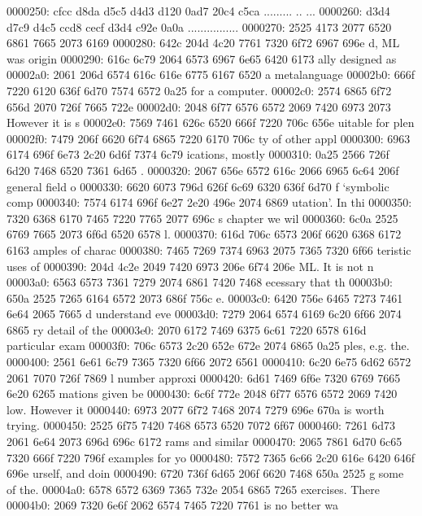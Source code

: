 0000250: cfcc d8da d5c5 d4d3 d120 0ad7 20c4 c5ca  ......... .. ...
0000260: d3d4 d7c9 d4c5 ccd8 cecf d3d4 c92e 0a0a  ................
0000270: 2525 4173 2077 6520 6861 7665 2073 6169  %
0000280: 642c 204d 4c20 7761 7320 6f72 6967 696e  d, ML was origin
0000290: 616c 6c79 2064 6573 6967 6e65 6420 6173  ally designed as
00002a0: 2061 206d 6574 616c 616e 6775 6167 6520   a metalanguage 
00002b0: 666f 7220 6120 636f 6d70 7574 6572 0a25  for a computer.%
00002c0: 2574 6865 6f72 656d 2070 726f 7665 722e  %
00002d0: 2048 6f77 6576 6572 2069 7420 6973 2073   However it is s
00002e0: 7569 7461 626c 6520 666f 7220 706c 656e  uitable for plen
00002f0: 7479 206f 6620 6f74 6865 7220 6170 706c  ty of other appl
0000300: 6963 6174 696f 6e73 2c20 6d6f 7374 6c79  ications, mostly
0000310: 0a25 2566 726f 6d20 7468 6520 7361 6d65  .%
0000320: 2067 656e 6572 616c 2066 6965 6c64 206f   general field o
0000330: 6620 6073 796d 626f 6c69 6320 636f 6d70  f `symbolic comp
0000340: 7574 6174 696f 6e27 2e20 496e 2074 6869  utation'. In thi
0000350: 7320 6368 6170 7465 7220 7765 2077 696c  s chapter we wil
0000360: 6c0a 2525 6769 7665 2073 6f6d 6520 6578  l.%
0000370: 616d 706c 6573 206f 6620 6368 6172 6163  amples of charac
0000380: 7465 7269 7374 6963 2075 7365 7320 6f66  teristic uses of
0000390: 204d 4c2e 2049 7420 6973 206e 6f74 206e   ML. It is not n
00003a0: 6563 6573 7361 7279 2074 6861 7420 7468  ecessary that th
00003b0: 650a 2525 7265 6164 6572 2073 686f 756c  e.%
00003c0: 6420 756e 6465 7273 7461 6e64 2065 7665  d understand eve
00003d0: 7279 2064 6574 6169 6c20 6f66 2074 6865  ry detail of the
00003e0: 2070 6172 7469 6375 6c61 7220 6578 616d   particular exam
00003f0: 706c 6573 2c20 652e 672e 2074 6865 0a25  ples, e.g. the.%
0000400: 2561 6e61 6c79 7365 7320 6f66 2072 6561  %
0000410: 6c20 6e75 6d62 6572 2061 7070 726f 7869  l number approxi
0000420: 6d61 7469 6f6e 7320 6769 7665 6e20 6265  mations given be
0000430: 6c6f 772e 2048 6f77 6576 6572 2069 7420  low. However it 
0000440: 6973 2077 6f72 7468 2074 7279 696e 670a  is worth trying.
0000450: 2525 6f75 7420 7468 6573 6520 7072 6f67  %
0000460: 7261 6d73 2061 6e64 2073 696d 696c 6172  rams and similar
0000470: 2065 7861 6d70 6c65 7320 666f 7220 796f   examples for yo
0000480: 7572 7365 6c66 2c20 616e 6420 646f 696e  urself, and doin
0000490: 6720 736f 6d65 206f 6620 7468 650a 2525  g some of the.%
00004a0: 6578 6572 6369 7365 732e 2054 6865 7265  exercises. There
00004b0: 2069 7320 6e6f 2062 6574 7465 7220 7761   is no better wa
